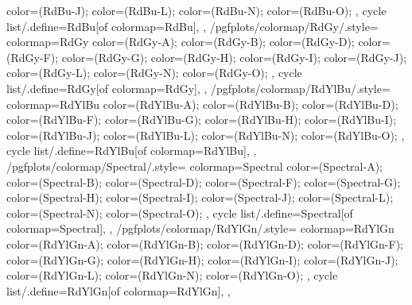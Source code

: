 {{{      color=(RdBu-J);
      color=(RdBu-L);
      color=(RdBu-N);
      color=(RdBu-O);
    },
    cycle list/.define={RdBu}{[of colormap=RdBu]},
  },
  /pgfplots/colormap/RdGy/.style={
    colormap={RdGy}{
      color=(RdGy-A);
      color=(RdGy-B);
      color=(RdGy-D);
      color=(RdGy-F);
      color=(RdGy-G);
      color=(RdGy-H);
      color=(RdGy-I);
      color=(RdGy-J);
      color=(RdGy-L);
      color=(RdGy-N);
      color=(RdGy-O);
    },
    cycle list/.define={RdGy}{[of colormap=RdGy]},
  },
  /pgfplots/colormap/RdYlBu/.style={
    colormap={RdYlBu}{
      color=(RdYlBu-A);
      color=(RdYlBu-B);
      color=(RdYlBu-D);
      color=(RdYlBu-F);
      color=(RdYlBu-G);
      color=(RdYlBu-H);
      color=(RdYlBu-I);
      color=(RdYlBu-J);
      color=(RdYlBu-L);
      color=(RdYlBu-N);
      color=(RdYlBu-O);
    },
    cycle list/.define={RdYlBu}{[of colormap=RdYlBu]},
  },
  /pgfplots/colormap/Spectral/.style={
    colormap={Spectral}{
      color=(Spectral-A);
      color=(Spectral-B);
      color=(Spectral-D);
      color=(Spectral-F);
      color=(Spectral-G);
      color=(Spectral-H);
      color=(Spectral-I);
      color=(Spectral-J);
      color=(Spectral-L);
      color=(Spectral-N);
      color=(Spectral-O);
    },
    cycle list/.define={Spectral}{[of colormap=Spectral]},
  },
  /pgfplots/colormap/RdYlGn/.style={
    colormap={RdYlGn}{
      color=(RdYlGn-A);
      color=(RdYlGn-B);
      color=(RdYlGn-D);
      color=(RdYlGn-F);
      color=(RdYlGn-G);
      color=(RdYlGn-H);
      color=(RdYlGn-I);
      color=(RdYlGn-J);
      color=(RdYlGn-L);
      color=(RdYlGn-N);
      color=(RdYlGn-O);
    },
    cycle list/.define={RdYlGn}{[of colormap=RdYlGn]},
  },
}

